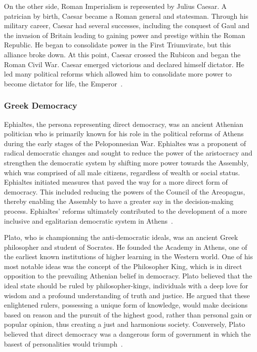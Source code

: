 \documentclass[jair,twoside,11pt,theapa]{article}
\begin{document}
On the other side, Roman Imperialism is represented by Julius Caesar.  A patrician by birth, Caesar became a Roman general and statesman.  Through his military career, Caesar had several successes, including the conquest of Gaul and the invasion of Britain leading to gaining power and prestige within the Roman Republic.  He began to consolidate power in the First Triumvirate, but this alliance broke down.  At this point, Caesar crossed the Rubicon and began the Roman Civil War.  Caesar emerged victorious and declared himself dictator.  He led many political reforms which allowed him to consolidate more power to become dictator for life, the Emperor~.

\subsubsection{Greek Democracy}
Ephialtes, the persona representing direct democracy, was an ancient Athenian politician who is primarily known for his role in the political reforms of Athens during the early stages of the Peloponnesian War.  Ephialtes was a proponent of radical democratic changes and sought to reduce the power of the aristocracy and strengthen the democratic system by shifting more power towards the Assembly, which was comprised of all male citizens, regardless of wealth or social status. Ephialtes initiated measures that paved the way for a more direct form of democracy. This included reducing the powers of the Council of the Areopagus, thereby enabling the Assembly to have a greater say in the decision-making process. Ephialtes' reforms ultimately contributed to the development of a more inclusive and egalitarian democratic system in Athens~.

Plato, who is championning the anti-democratic ideals, was an ancient Greek philosopher and student of Socrates. He founded the Academy in Athens, one of the earliest known institutions of higher learning in the Western world. One of his most notable ideas was the concept of the Philosopher King, which is in direct opposition to the prevailing Athenian belief in democracy.  Plato believed that the ideal state should be ruled by philosopher-kings, individuals with a deep love for wisdom and a profound understanding of truth and justice. He argued that these enlightened rulers, possessing a unique form of knowledge, would make decisions based on reason and the pursuit of the highest good, rather than personal gain or popular opinion, thus creating a just and harmonious society.  Conversely, Plato believed that direct democracy was a dangerous form of government in which the basest of personalities would triumph~.
\end{document}
